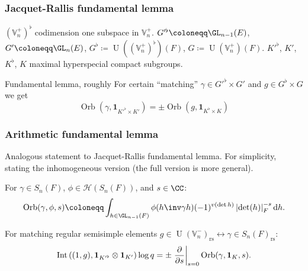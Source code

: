\documentclass[11pt]{beamer}
\DeclareMathOperator{\Int}{Int}
\DeclareMathOperator{\Orb}{Orb}
\DeclareMathOperator{\U}{U}
\newcommand{\HH}{\mathcal{H}}
\newcommand{\VV}{\mathbb{V}}
\newcommand{\rs}{_{\text{rs}}}
\begin{document}
\begin{frame}
  \frametitle{Jacquet-Rallis fundamental lemma}
  \begin{itemize}
  \ii $(\VV_n^+)^\flat$ codimension one subspace in $\VV_n^+$.
  \ii $G'^\flat \coloneqq \GL_{n-1}(E)$, $G' \coloneqq \GL_n(E)$,
    $G^\flat \coloneqq \U((\VV_n^+)^\flat)(F)$, $G \coloneqq \U(\VV_n^+)(F)$.
  \ii $K'^\flat$, $K'$, $K^\flat$, $K$ maximal hyperspecial compact subgroups.
  \end{itemize}
  \begin{block}{Fundamental lemma, roughly}
    For certain ``matching''
    $\gamma \in G'^\flat \times G'$ and $g \in G^\flat \times G$
    we get
   \[ \Orb(\gamma, \mathbf{1}_{K'^\flat \times K'}) = \pm \Orb(g, \mathbf{1}_{K^\flat \times K}) \]
  \end{block}
\end{frame}
\begin{frame}
  \frametitle{Arithmetic fundamental lemma}
  Analogous statement to Jacquet-Rallis fundamental lemma.
  For simplicity, stating the inhomogeneous version (the full version is more general).
  \begin{definition}
  For $\gamma \in S_n(F)$, $\phi \in \HH(S_n(F))$, and $s \in \CC$:
  \[ \Orb(\gamma, \phi, s) \coloneqq
    \int_{h \in \GL_{n-1}(F)} \phi(h\inv \gamma h) (-1)^{v(\det h)}
    \left\lvert \det(h) \right\rvert_F^{-s} \odif h. \]
  \end{definition}
  \begin{theorem}
  For matching regular semisimple elements
  $g \in \U(\VV_n^-)\rs \longleftrightarrow \gamma \in S_n(F)\rs$:
  \[
    \Int\left( (1,g), \mathbf{1}_{K'^\flat} \otimes \mathbf{1}_{K'} \right) \log q
    = \pm \left. \pdv{}{s} \right\rvert_{s=0} \Orb(\gamma, \mathbf{1}_K, s).
  \]
  \end{theorem}
\end{frame}

\end{document}
